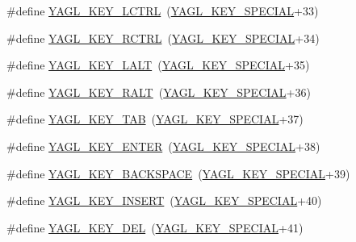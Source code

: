 \begin{DoxyCompactItemize}
\item 
\#define \hyperlink{group____consts__key__mouse_ga2454e62261deaf640ca49a56c5664e67}{Y\-A\-G\-L\-\_\-\-K\-E\-Y\-\_\-\-L\-C\-T\-R\-L}~(\hyperlink{group____consts__key__mouse_gae6060c5e0a8f15c67d28e1a1f0765d7b}{Y\-A\-G\-L\-\_\-\-K\-E\-Y\-\_\-\-S\-P\-E\-C\-I\-A\-L}+33)
\item 
\#define \hyperlink{group____consts__key__mouse_gaa4d5f9544f6e2f9d4832f03acaacaedd}{Y\-A\-G\-L\-\_\-\-K\-E\-Y\-\_\-\-R\-C\-T\-R\-L}~(\hyperlink{group____consts__key__mouse_gae6060c5e0a8f15c67d28e1a1f0765d7b}{Y\-A\-G\-L\-\_\-\-K\-E\-Y\-\_\-\-S\-P\-E\-C\-I\-A\-L}+34)
\item 
\#define \hyperlink{group____consts__key__mouse_gae7e5464eb6dba9d26bd3d6e2c4eb5a1c}{Y\-A\-G\-L\-\_\-\-K\-E\-Y\-\_\-\-L\-A\-L\-T}~(\hyperlink{group____consts__key__mouse_gae6060c5e0a8f15c67d28e1a1f0765d7b}{Y\-A\-G\-L\-\_\-\-K\-E\-Y\-\_\-\-S\-P\-E\-C\-I\-A\-L}+35)
\item 
\#define \hyperlink{group____consts__key__mouse_gadabf36444ace4161b3ad2b8edd976066}{Y\-A\-G\-L\-\_\-\-K\-E\-Y\-\_\-\-R\-A\-L\-T}~(\hyperlink{group____consts__key__mouse_gae6060c5e0a8f15c67d28e1a1f0765d7b}{Y\-A\-G\-L\-\_\-\-K\-E\-Y\-\_\-\-S\-P\-E\-C\-I\-A\-L}+36)
\item 
\#define \hyperlink{group____consts__key__mouse_ga63b10d830e49f91388edaaa2a568e67e}{Y\-A\-G\-L\-\_\-\-K\-E\-Y\-\_\-\-T\-A\-B}~(\hyperlink{group____consts__key__mouse_gae6060c5e0a8f15c67d28e1a1f0765d7b}{Y\-A\-G\-L\-\_\-\-K\-E\-Y\-\_\-\-S\-P\-E\-C\-I\-A\-L}+37)
\item 
\#define \hyperlink{group____consts__key__mouse_gac2850e1903fb3d2996f109a390694a24}{Y\-A\-G\-L\-\_\-\-K\-E\-Y\-\_\-\-E\-N\-T\-E\-R}~(\hyperlink{group____consts__key__mouse_gae6060c5e0a8f15c67d28e1a1f0765d7b}{Y\-A\-G\-L\-\_\-\-K\-E\-Y\-\_\-\-S\-P\-E\-C\-I\-A\-L}+38)
\item 
\#define \hyperlink{group____consts__key__mouse_ga98e632e82a43014e83f698f6b3ee8b5c}{Y\-A\-G\-L\-\_\-\-K\-E\-Y\-\_\-\-B\-A\-C\-K\-S\-P\-A\-C\-E}~(\hyperlink{group____consts__key__mouse_gae6060c5e0a8f15c67d28e1a1f0765d7b}{Y\-A\-G\-L\-\_\-\-K\-E\-Y\-\_\-\-S\-P\-E\-C\-I\-A\-L}+39)
\item 
\#define \hyperlink{group____consts__key__mouse_ga0bd2f413811a452fcde667c50146ac8f}{Y\-A\-G\-L\-\_\-\-K\-E\-Y\-\_\-\-I\-N\-S\-E\-R\-T}~(\hyperlink{group____consts__key__mouse_gae6060c5e0a8f15c67d28e1a1f0765d7b}{Y\-A\-G\-L\-\_\-\-K\-E\-Y\-\_\-\-S\-P\-E\-C\-I\-A\-L}+40)
\item 
\#define \hyperlink{group____consts__key__mouse_ga2fee2fdb7371a37162362637cddb92da}{Y\-A\-G\-L\-\_\-\-K\-E\-Y\-\_\-\-D\-E\-L}~(\hyperlink{group____consts__key__mouse_gae6060c5e0a8f15c67d28e1a1f0765d7b}{Y\-A\-G\-L\-\_\-\-K\-E\-Y\-\_\-\-S\-P\-E\-C\-I\-A\-L}+41)

\end{DoxyCompactItemize}
